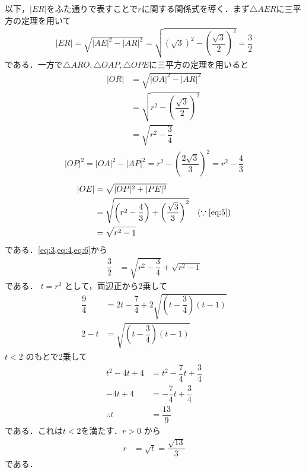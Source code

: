 \documentclass[../../main.tex]{subfiles}
\begin{document}
以下，$|ER|$をふた通りで表すことで$r$に関する関係式を導く．まず$\triangle AER$に三平方の定理を用いて
\begin{align}
  |ER| = \sqrt{|AE|^2-|AR|^2} = \sqrt{(\sqrt{3})^2-\left(\dfrac{\sqrt{3}}{2}\right)^2} = \dfrac{3}{2} \label{eq:3}
\end{align}
である．一方で$\triangle ARO, \triangle OAP, \triangle OPE$に三平方の定理を用いると
\begin{align}
  |OR|
  &= \sqrt{|OA|^2 - |AR|^2} \\
  &= \sqrt{r^2 - \left(\dfrac{\sqrt{3}}{2}\right)^2} \\
  &= \sqrt{r^2 - \dfrac{3}{4}} \label{eq:4}
\end{align}
\begin{align}
  |OP|^2 = |OA|^2 - |AP|^2 = r^2 - \left(\dfrac{2\sqrt{3}}{3}\right)^2 = r^2 - \dfrac{4}{3} \label{eq:5}
\end{align}
\begin{align}
  |OE|
  &= \sqrt{|OP|^2+|PE|^2} \\
  & = \sqrt{\left(r^2 - \dfrac{4}{3}\right)+\left(\dfrac{\sqrt{3}}{3}\right)^2} \quad (\because\text{\cref{eq:5}})\\
  &= \sqrt{r^2 - 1} \label{eq:6}
\end{align}
である．\cref{eq:3,eq:4,eq:6}から
\begin{align}
  \dfrac{3}{2} &= \sqrt{r^2 - \dfrac{3}{4}} + \sqrt{r^2 - 1} \label{eq:7}
\end{align}
である．
$t = r^2$ として，両辺正から2乗して
\begin{align}
  \dfrac{9}{4} &= 2t - \dfrac{7}{4} + 2\sqrt{\left(t - \dfrac{3}{4}\right)(t - 1)} \\
  2 - t &= \sqrt{\left(t - \dfrac{3}{4}\right)(t - 1)}
\end{align}
$t < 2$ のもとで2乗して
\begin{align}
  t^2-4t+4 &= t^2-\dfrac{7}{4}t+\dfrac{3}{4} \\
  -4t + 4 &= -\dfrac{7}{4}t + \dfrac{3}{4} \\
  \therefore
  t &= \dfrac{13}{9}
\end{align}
である．これは$t<2$を満たす．$r > 0$ から
\begin{align}
  r &= \sqrt{t} = \dfrac{\sqrt{13}}{3}
\end{align}
である．
\end{document}
